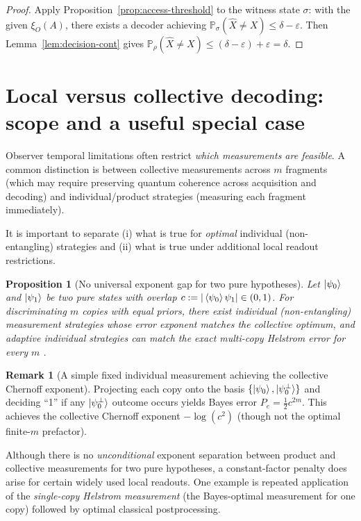 \documentclass[11pt]{article}
\newcommand{\Prob}{\mathbb{P}}
\newcommand{\1}{\mathbf{1}}
\newcommand{\QCBdist}{\xi}
\theoremstyle{definition}
\newtheorem{remark}{Remark}
\theoremstyle{plain}
\newtheorem{proposition}{Proposition}
\begin{document}
\begin{proof}
Apply Proposition~\ref{prop:access-threshold} to the witness state $\sigma$: with the given $\QCBdist_O(A)$, there exists a decoder achieving
$\Prob_{\sigma}(\widehat{X}\neq X)\le \delta-\varepsilon$.
Then Lemma~\ref{lem:decision-cont} gives
$\Prob_{\rho}(\widehat{X}\neq X)\le (\delta-\varepsilon)+\varepsilon=\delta$.
\end{proof}

\section{Local versus collective decoding: scope and a useful special case}
\label{sec:local-vs-global}

Observer temporal limitations often restrict \emph{which measurements are feasible}.
A common distinction is between collective measurements across $m$ fragments (which may require preserving quantum coherence across acquisition and decoding) and individual/product strategies (measuring each fragment immediately).

It is important to separate (i) what is true for \emph{optimal} individual (non-entangling) strategies and (ii) what is true under additional local readout restrictions.

\begin{proposition}[No universal exponent gap for two pure hypotheses]
\label{prop:no-gap-pure}
Let $\ket{\psi_0}$ and $\ket{\psi_1}$ be two pure states with overlap $c:=|\braket{\psi_0}{\psi_1}|\in(0,1)$.
For discriminating $m$ copies with equal priors, there exist individual (non-entangling) measurement strategies whose error exponent matches the collective optimum, and adaptive individual strategies can match the exact multi-copy Helstrom error for every $m$ \citep{AcinBaganBaigMasanesMunozTapia2005}.
\end{proposition}

\begin{remark}[A simple fixed individual measurement achieving the collective Chernoff exponent]
Projecting each copy onto the basis $\{\ket{\psi_0},\ket{\psi_0^\perp}\}$ and deciding ``1'' if any $\ket{\psi_0^\perp}$ outcome occurs yields Bayes error $P_e=\tfrac12 c^{2m}$.
This achieves the collective Chernoff exponent $-\log(c^{2})$ (though not the optimal finite-$m$ prefactor).
\end{remark}

Although there is no \emph{unconditional} exponent separation between product and collective measurements for two pure hypotheses, a constant-factor penalty does arise for certain widely used local readouts.
One example is repeated application of the \emph{single-copy Helstrom measurement} (the Bayes-optimal measurement for one copy) followed by optimal classical postprocessing.
\end{document}
